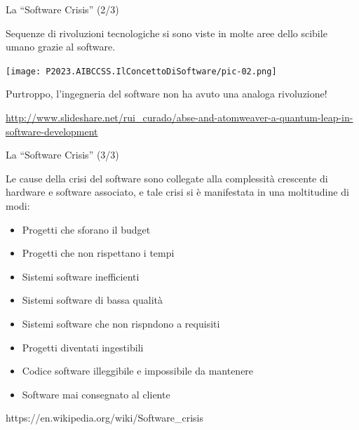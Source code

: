 \documentclass{beamer}
\begin{document}
\begin{frame}{\centerline{La ``Software Crisis'' (2/3)}}

Sequenze di rivoluzioni tecnologiche si sono viste in molte aree dello scibile umano grazie al software.

\begin{center}
\texttt{[image: P2023.AIBCCSS.IlConcettoDiSoftware/pic-02.png]}
\end{center}
Purtroppo, l'ingegneria del software non ha avuto una analoga rivoluzione!

\begin{center}
\tiny
\url{http://www.slideshare.net/rui\_curado/abse-and-atomweaver-a-quantum-leap-in-software-development}
\end{center}



\end{frame}
\begin{frame}{\centerline{La ``Software Crisis'' (3/3)}}

Le cause della crisi del software sono collegate  alla complessit\`{a} crescente di hardware e software associato, e tale crisi si \`{e} manifestata in una moltitudine di modi:
\begin{itemize}
\item Progetti che sforano il budget
\item Progetti che non rispettano i tempi
\item Sistemi software inefficienti
\item Sistemi software di bassa qualit\`{a}
\item Sistemi software che non rispndono a requisiti
\item Progetti diventati ingestibili
\item Codice software illeggibile e impossibile da mantenere
\item Software mai consegnato al cliente
\end{itemize}

\begin{small}
https://en.wikipedia.org/wiki/Software\_crisis
\end{small}
\end{frame}
\end{document}
